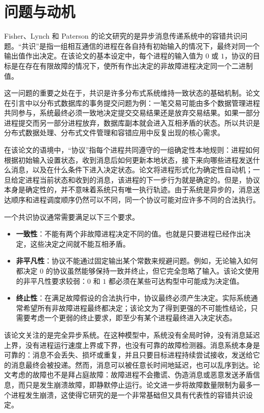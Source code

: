 \section{问题与动机}

Fisher、Lynch 和 Paterson 的论文研究的是异步消息传递系统中的容错共识问题。“共识”是指一组相互通信的进程在各自持有初始输入的情况下，最终对同一个输出值作出决定。在该论文的基本设定中，每个进程的输入值为 $0$ 或 $1$，协议的目标是在存在有限故障的情况下，使所有作出决定的非故障进程决定同一个二进制值。

这一问题的重要之处在于，共识是许多分布式系统维持一致状态的基础机制。论文在引言中以分布式数据库的事务提交问题为例：一笔交易可能由多个数据管理进程共同参与，系统最终必须一致地决定提交交易结果还是放弃交易结果。如果一部分进程提交而另一部分进程放弃，数据库副本就会进入互相矛盾的状态。所以共识是分布式数据处理、分布式文件管理和容错应用中反复出现的核心需求。

在该论文的语境中，“协议”指每个进程共同遵守的一组确定性本地规则：进程如何根据初始输入设置状态，收到消息后如何更新本地状态，接下来向哪些进程发送什么消息，以及在什么条件下进入决定状态。论文将进程形式化为确定性自动机；一旦给定进程当前状态和收到的消息，该进程的下一步行为就是确定的。但是，协议本身是确定性的，并不意味着系统只有唯一执行轨迹。由于系统是异步的，消息送达顺序和进程调度顺序仍然可以不同，同一个协议可能对应许多不同的合法执行。

一个共识协议通常需要满足以下三个要求。

\begin{itemize}
  \item \textbf{一致性}：不能有两个非故障进程决定不同的值。也就是只要进程已经作出决定，这些决定之间就不能互相矛盾。
  \item \textbf{非平凡性}：协议不能通过固定输出某个常数来规避问题。例如，无论输入如何都决定 $0$ 的协议虽然能够保持一致并终止，但它完全忽略了输入。该论文使用的非平凡性要求较弱：$0$ 和 $1$ 都必须在某些可达构型中可能成为决定值。
  \item \textbf{终止性}：在满足故障假设的合法执行中，协议最终必须产生决定。实际系统通常希望所有非故障进程最终都决定；该论文为了得到更强的不可能性结论，只需要考虑一个更弱的终止要求，即至少有某个进程最终进入决定状态。
\end{itemize}

该论文关注的是完全异步系统。在这种模型中，系统没有全局时钟，没有消息延迟上界，没有进程运行速度上界或下界，也没有可靠的故障检测器。消息系统本身是可靠的：消息不会丢失、损坏或重复，并且只要目标进程持续尝试接收，发送给它的消息最终会被投递。然而，消息可以被任意长时间地延迟，也可以乱序到达。论文考虑的故障也不是拜占庭故障：故障进程不会撒谎、伪造消息或恶意发送矛盾信息，而只是发生崩溃故障，即静默停止运行。论文进一步将故障数量限制为最多一个进程发生崩溃，这使得它研究的是一个非常基础但又具有代表性的容错共识设定。

